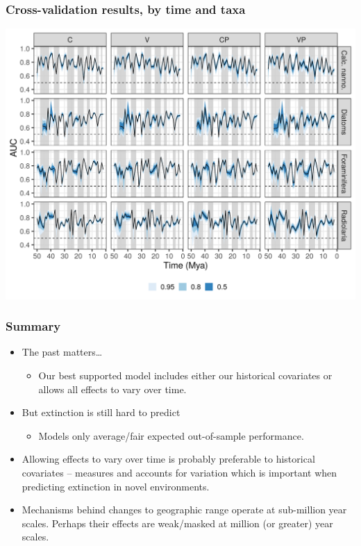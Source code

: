\documentclass[aspectratio=169]{beamer}
\begin{document}
\begin{frame}
  \frametitle{Cross-validation results, by time and taxa}

  \begin{center}
    \includegraphics[width=\textwidth,height=0.8\textheight,keepaspectratio=true]{../results/figure/fold_auc_taxon_time_full}
  \end{center}

\end{frame}


\begin{frame}
  \frametitle{Summary}

  \begin{large}
    \begin{itemize}
      \item \alert{The past matters\dots} 
        \begin{itemize}
          \item Our best supported model includes either our historical covariates or allows all effects to vary over time.
        \end{itemize}
      \item \alert{But extinction is still hard to predict}
        \begin{itemize}
          \item Models only average/fair expected out-of-sample performance.
        \end{itemize}
      \item Allowing effects to vary over time is probably preferable to historical covariates -- measures and accounts for variation which is important when predicting extinction in novel environments.
      \item Mechanisms behind changes to geographic range operate at sub-million year scales. Perhaps their effects are weak/masked at million (or greater) year scales.
    \end{itemize}
  \end{large}

\end{frame}
\end{document}
